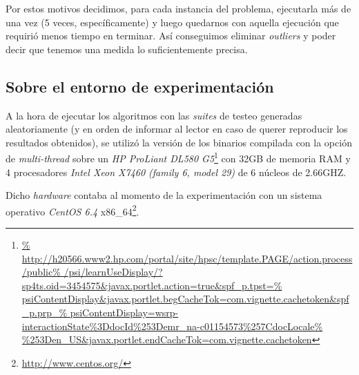 \par Por estos motivos decidimos, para cada instancia del problema, ejecutarla
    m\'as de una vez (5 veces, espec\'ificamente) y luego quedarnos con aquella
    ejecuci\'on que requiri\'o menos tiempo en terminar. As\'i
    conseguimos eliminar \emph{outliers} y poder decir que tenemos una medida
    lo suficientemente precisa.

{}
\subsection*{Sobre el entorno de experimentaci\'on}
\par A la hora de ejecutar los algoritmos con las \emph{suites} de testeo
    generadas aleatoriamente (y en orden de informar al lector en caso
    de querer reproducir los resultados obtenidos), se utiliz\'o la versi\'on
    de los binarios compilada con la opci\'on de \emph{multi-thread} sobre
    un \emph{HP ProLiant DL580 G5}\footnote{\url{%
    http://h20566.www2.hp.com/portal/site/hpsc/template.PAGE/action.process/public%
    /psi/learnUseDisplay/?sp4ts.oid=3454575&javax.portlet.action=true&spf_p.tpst=%
    psiContentDisplay&javax.portlet.begCacheTok=com.vignette.cachetoken&spf_p.prp_%
    psiContentDisplay=wsrp-interactionState\%3DdocId\%253Demr_na-c01154573\%257CdocLocale%
    \%253Den_US&javax.portlet.endCacheTok=com.vignette.cachetoken}} con 32GB
    de memoria RAM y 4 procesadores \emph{Intel Xeon X7460 (family 6, model 29)}
    de 6 n\'ucleos de 2.66GHZ.

\par Dicho \emph{hardware} contaba al momento de la experimentaci\'on con un 
    sistema operativo \emph{CentOS 6.4} x86\_64\footnote{\url{http://www.centos.org/}}.
